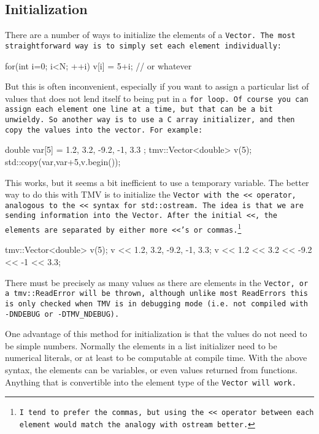 \subsection{Initialization}
\label{Vector_Initialization}

There are a number of ways to initialize the elements of a \tt{Vector}.
The most straightforward way is to simply set each element individually:
\begin{tmvcode}
for(int i=0; i<N; ++i) {
    v[i] = 5+i; // or whatever
}
\end{tmvcode}
But this is often inconvenient, especially if you want to assign a particular list of 
values that does not lend itself to being put in a \tt{for} loop.  Of course you can assign
each element one line at a time, but that can be a bit unwieldy.  So another 
way is to use a C array initializer, and then copy the values into the vector.  For example:
\begin{tmvcode}
double var[5] = { 1.2, 3.2, -9.2, -1, 3.3 };
tmv::Vector<double> v(5);
std::copy(var,var+5,v.begin());
\end{tmvcode}
This works, but it seems a bit inefficient to use a temporary variable.
The better way to do this with TMV is to initialize the \tt{Vector} with the \tt{<<} operator, analogous to the \tt{<<} syntax for \tt{std::ostream}.
The idea is that we are sending information into the \tt{Vector}.  
After the initial \tt{<<}, the elements are separated by either more \tt{<<}'s or commas.\footnote{
I tend to prefer the commas, but using the \tt{<<} operator between each element would
match the analogy with \tt{ostream} better.}
\begin{tmvcode}
tmv::Vector<double> v(5);
v << 1.2, 3.2, -9.2, -1, 3.3;
v << 1.2 << 3.2 << -9.2 << -1 << 3.3;
\end{tmvcode}
There must be precisely as many values as there are elements in the \tt{Vector},
or a \tt{tmv::ReadError} will be thrown, although unlike most \tt{ReadError}s this is only 
checked when TMV is in debugging mode (i.e. not compiled with \tt{-DNDEBUG} or \tt{-DTMV_NDEBUG}).

One advantage of this method for initialization is that the values do not need to be simple numbers.
Normally the elements in a list initializer need to be numerical literals, or at least to be 
computable at compile time.
With the above syntax, the elements can be variables, 
or even values returned from functions.  Anything that is convertible
into the element type of the \tt{Vector} will work.

